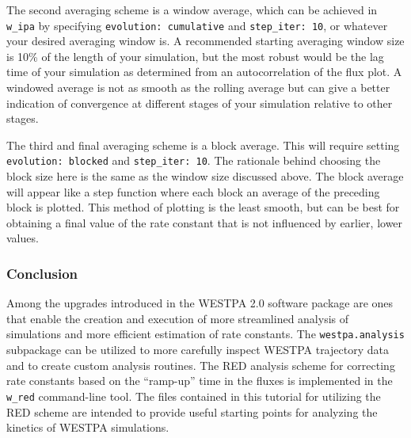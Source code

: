 The second averaging scheme is a window average, which can be achieved in \verb|w_ipa| by specifying \verb|evolution: cumulative| and \verb|step_iter: 10|, or whatever your desired averaging window is.
A recommended starting averaging window size is 10\% of the length of your simulation, but the most robust would be the lag time of your simulation as determined from an autocorrelation of the flux plot.
A windowed average is not as smooth as the rolling average but can give a better indication of convergence at different stages of your simulation relative to other stages.

The third and final averaging scheme is a block average.
This will require setting \verb|evolution: blocked| and \verb|step_iter: 10|.
The rationale behind choosing the block size here is the same as the window size discussed above.
The block average will appear like a step function where each block an average of the preceding block is plotted.
This method of plotting is the least smooth, but can be best for obtaining a final value of the rate constant that is not influenced by earlier, lower values.

\subsubsection{Conclusion}

Among the upgrades introduced in the WESTPA 2.0 software package are ones that enable the creation and execution of more streamlined analysis of simulations and more efficient estimation of rate constants.
The \verb|westpa.analysis| subpackage can be utilized to more carefully inspect WESTPA trajectory data and to create custom analysis routines.
The RED analysis scheme for correcting rate constants based on the “ramp-up” time in the fluxes is implemented in the \verb|w_red| command-line tool.
The files contained in this tutorial for utilizing the RED scheme are intended to provide useful starting points for analyzing the kinetics of WESTPA simulations.